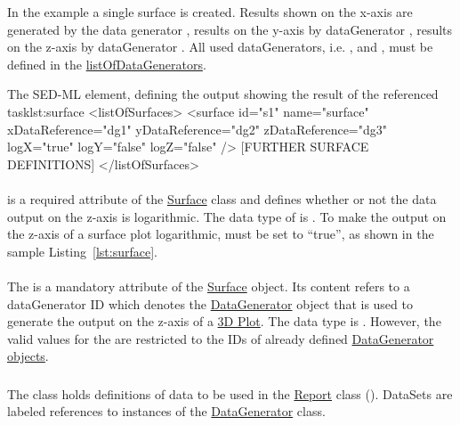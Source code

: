In the example a single surface is created. Results shown on the x-axis are generated by the data generator , results on the y-axis by dataGenerator , results on the z-axis by dataGenerator . All used dataGenerators, i.e. ,  and , must be defined in the \hyperref[sec:listOfDataGenerators]{listOfDataGenerators}.
\begin{myXmlLst}{The SED-ML  element, defining the output showing the result of the referenced task}{lst:surface}
<listOfSurfaces>
	<surface id="s1" name="surface" xDataReference="dg1" yDataReference="dg2" zDataReference="dg3" 
		logX="true"  logY="false" logZ="false" />
	[FURTHER SURFACE DEFINITIONS]
</listOfSurfaces>
\end{myXmlLst}

\paragraph{}
\label{sec:logZ}
 is a required attribute of the \hyperref[class:surface]{Surface} class and defines whether or not the data output on the z-axis is logarithmic. The data type of  is .
To make the output on the z-axis of a surface plot logarithmic,  must be set to ``true'', as shown in the sample Listing~\ref{lst:surface}.

\paragraph{}
\label{sec:zDataReference}
The  is a mandatory attribute of the \hyperref[class:surface]{Surface} object. Its content refers to a dataGenerator ID which denotes the \hyperref[class:dataGenerator]{DataGenerator} object that is used to generate the output on the z-axis of a \hyperref[class:plot3D]{3D Plot}.
The  data type is . However, the valid values for the  are restricted to the IDs of already defined \hyperref[class:dataGenerator]{DataGenerator objects}.

\subsubsection{}
\label{class:dataSet}
The  class holds definitions of data to be used in the \hyperref[class:report]{Report} class (). DataSets are labeled references to instances of the \hyperref[class:dataGenerator]{DataGenerator} class.

